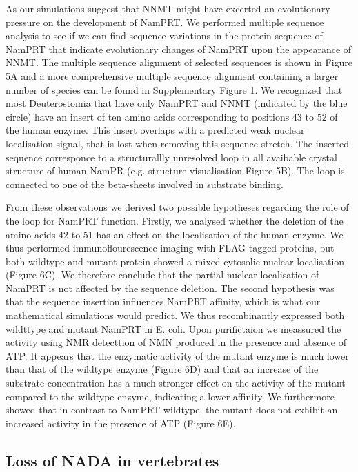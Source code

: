 As our simulations suggest that NNMT might have excerted an evolutionary pressure on the development of NamPRT. We performed multiple sequence analysis to see if we can find sequence variations in the protein sequence of NamPRT that indicate evolutionary changes of NamPRT upon the appearance of NNMT. The multiple sequence alignment of selected sequences is shown in Figure 5A and a more comprehensive multiple sequence alignment containing a larger number of species can be found in Supplementary Figure 1.  We recognized that most Deuterostomia that have only NamPRT and NNMT (indicated by the blue circle) have an insert of ten amino acids corresponding to positions 43 to 52 of the human enzyme. This insert overlaps with a predicted weak nuclear localisation signal, that is lost when removing this sequence stretch. The inserted sequence corresponce to a structurallly unresolved loop in all avaibable crystal structure of human NamPR (e.g. \cite{Wang2006} structure visualisation Figure 5B). The loop is connected to one of the beta-sheets involved in substrate binding.

From these observations we derived two possible hypotheses regarding the role of the loop for NamPRT function. Firstly, we analysed whether the deletion of the amino acids 42 to 51 has an effect on the localisation of the human enzyme. We thus performed immunoflourescence imaging with FLAG-tagged proteins, but both wildtype and mutant protein showed a mixed cytosolic nuclear localisation (Figure 6C). We therefore conclude that the partial nuclear localisation of NamPRT is not affected by the sequence deletion.
The second hypothesis was that the sequence insertion influences NamPRT affinity, which is what our mathematical simulations would predict. We thus recombinantly expressed  both wildttype and mutant  NamPRT  in E. coli.  Upon purifictaion we meassured the activity using NMR detecttion of NMN produced in the presence and absence of ATP. It appears that the enzymatic activity of the mutant enzyme is much lower than that of the wildtype enzyme (Figure 6D) and that an increase of the substrate concentration has a much stronger effect on the activity of the mutant compared to the wildtype enzyme, indicating a lower affinity.  We furthermore showed  that in contrast to NamPRT wildtype, the mutant does not exhibit an increased activity in the presence of ATP (Figure 6E). 

\subsection{Loss of NADA in vertebrates}

